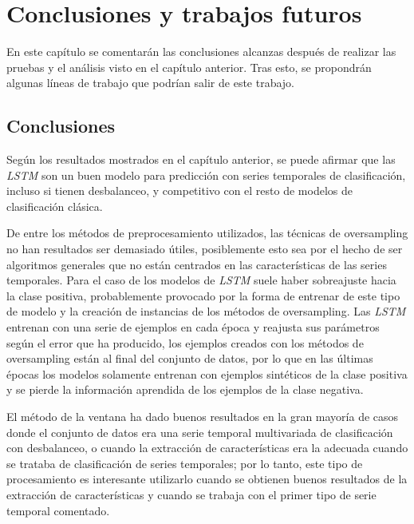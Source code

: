 \chapter{Conclusiones y trabajos futuros}
En este capítulo se comentarán las conclusiones alcanzas después de realizar las pruebas y el análisis visto en el capítulo anterior. Tras esto, se propondrán algunas líneas de trabajo que podrían salir de este trabajo.\newline

\section{Conclusiones}
Según los resultados mostrados en el capítulo anterior, se puede afirmar que las \textit{LSTM} son un buen modelo para predicción con series temporales de clasificación, incluso si tienen desbalanceo, y competitivo con el resto de modelos de clasificación clásica.\newline

De entre los métodos de preprocesamiento utilizados, las técnicas de oversampling no han resultados ser demasiado útiles, posiblemente esto sea por el hecho de ser algoritmos generales que no están centrados en las características de las series temporales. Para el caso de los modelos de \textit{LSTM} suele haber sobreajuste hacia la clase positiva, probablemente provocado por la forma de entrenar de este tipo de modelo y la creación de instancias de los métodos de oversampling. Las \textit{LSTM} entrenan con una serie de ejemplos en cada época y reajusta sus parámetros según el error que ha producido, los ejemplos creados con los métodos de oversampling están al final del conjunto de datos, por lo que en las últimas épocas los modelos solamente entrenan con ejemplos sintéticos de la clase positiva y se pierde la información aprendida de los ejemplos de la clase negativa. \newline

El método de la ventana ha dado buenos resultados en la gran mayoría de casos donde el conjunto de datos era una serie temporal multivariada de clasificación con desbalanceo, o cuando la extracción de características era la adecuada cuando se trataba de clasificación de series temporales; por lo tanto, este tipo de procesamiento es interesante utilizarlo cuando se obtienen buenos resultados de la extracción de características y cuando se trabaja con el primer tipo de serie temporal comentado.\newline

